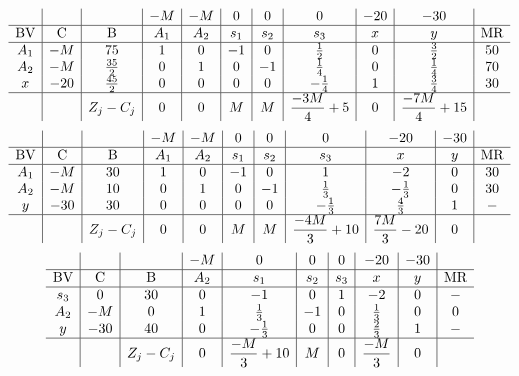 \documentclass{article}
\begin{document}
\begin{align*}
\begin{array}{c|c|c|c|c|c|c|c|c|c|c}
 &  &  & -M & -M & 0 & 0 & 0 & -20 & -30 & \\
\hline
\text{BV} & \text{C} & \text{B} & A_{1} & A_{2} & s_{1} & s_{2} & s_{3} & x & y & \text{MR} \\
\hline
A_{1} & -M & 75 & 1 & 0 & -1 & 0 & \frac{1}{2} & 0 & \frac{3}{2} & 50 \\
A_{2} & -M & \frac{35}{2} & 0 & 1 & 0 & -1 & \frac{1}{4} & 0 & \frac{1}{4} & 70 \\
x & -20 & \frac{45}{2} & 0 & 0 & 0 & 0 & -\frac{1}{4} & 1 & \frac{3}{4} & 30 \\
\hline
 &  & Z_j-C_j & 0 & 0 & M & M & \dfrac{-3M}{4} + 5 & 0 & \dfrac{-7M}{4} + 15 & \\
\end{array}
\end{align*}
\begin{align*}
\begin{array}{c|c|c|c|c|c|c|c|c|c|c}
 &  &  & -M & -M & 0 & 0 & 0 & -20 & -30 & \\
\hline
\text{BV} & \text{C} & \text{B} & A_{1} & A_{2} & s_{1} & s_{2} & s_{3} & x & y & \text{MR} \\
\hline
A_{1} & -M & 30 & 1 & 0 & -1 & 0 & 1 & -2 & 0 & 30 \\
A_{2} & -M & 10 & 0 & 1 & 0 & -1 & \frac{1}{3} & -\frac{1}{3} & 0 & 30 \\
y & -30 & 30 & 0 & 0 & 0 & 0 & -\frac{1}{3} & \frac{4}{3} & 1 & - \\
\hline
 &  & Z_j-C_j & 0 & 0 & M & M & \dfrac{-4M}{3} + 10 & \dfrac{7M}{3} - 20 & 0 & \\
\end{array}
\end{align*}
\begin{align*}
\begin{array}{c|c|c|c|c|c|c|c|c|c}
 &  &  & -M & 0 & 0 & 0 & -20 & -30 & \\
\hline
\text{BV} & \text{C} & \text{B} & A_{2} & s_{1} & s_{2} & s_{3} & x & y & \text{MR} \\
\hline
s_{3} & 0 & 30 & 0 & -1 & 0 & 1 & -2 & 0 & - \\
A_{2} & -M & 0 & 1 & \frac{1}{3} & -1 & 0 & \frac{1}{3} & 0 & 0 \\
y & -30 & 40 & 0 & -\frac{1}{3} & 0 & 0 & \frac{2}{3} & 1 & - \\
\hline
 &  & Z_j-C_j & 0 & \dfrac{-M}{3} + 10 & M & 0 & \dfrac{-M}{3} & 0 & \\
\end{array}
\end{align*}
\end{document}
